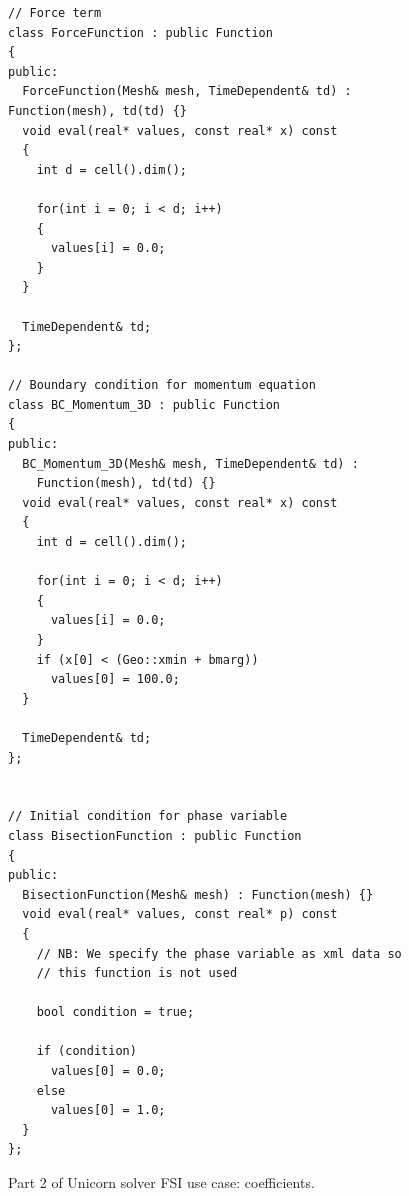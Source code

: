 \begin{figure}[!h]
\begin{lstlisting}
// Force term
class ForceFunction : public Function
{
public:
  ForceFunction(Mesh& mesh, TimeDependent& td) : Function(mesh), td(td) {}
  void eval(real* values, const real* x) const
  {
    int d = cell().dim();

    for(int i = 0; i < d; i++)
    {
      values[i] = 0.0;
    }
  }

  TimeDependent& td;
};

// Boundary condition for momentum equation
class BC_Momentum_3D : public Function
{
public:
  BC_Momentum_3D(Mesh& mesh, TimeDependent& td) :
    Function(mesh), td(td) {}
  void eval(real* values, const real* x) const
  {
    int d = cell().dim();

    for(int i = 0; i < d; i++)
    {
      values[i] = 0.0;
    }
    if (x[0] < (Geo::xmin + bmarg))
      values[0] = 100.0;
  }

  TimeDependent& td;
};


// Initial condition for phase variable
class BisectionFunction : public Function
{
public:
  BisectionFunction(Mesh& mesh) : Function(mesh) {}
  void eval(real* values, const real* p) const
  {
    // NB: We specify the phase variable as xml data so
    // this function is not used

    bool condition = true;

    if (condition)
      values[0] = 0.0;
    else
      values[0] = 1.0;
  }
};
\end{lstlisting}
\caption{Part 2 of Unicorn solver FSI use case: coefficients.}
\end{figure}

